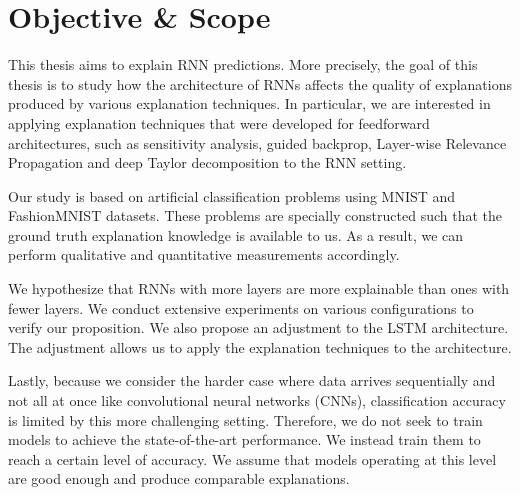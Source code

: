 \section{Objective \& Scope}
This thesis aims to explain RNN predictions. More precisely, the goal of this thesis is to study how the architecture of RNNs affects the quality of explanations produced by various explanation techniques. In particular, we are interested in applying explanation techniques that were developed for feedforward architectures, such as sensitivity analysis, guided backprop, Layer-wise Relevance Propagation and deep Taylor decomposition to the RNN setting. 

Our study is based on artificial classification problems using MNIST and FashionMNIST datasets. These problems are specially constructed such that the ground truth explanation knowledge is available to us. As a result, we can perform qualitative and quantitative measurements accordingly.


We hypothesize that RNNs with more layers are more explainable than ones with fewer layers. We conduct extensive experiments on various configurations to verify our proposition. We also propose an adjustment to the LSTM architecture. The adjustment allows us to apply the explanation techniques to the architecture.

Lastly, because we consider the harder case where data arrives sequentially and not all at once like convolutional neural networks (CNNs), classification accuracy is limited by this more challenging setting. Therefore, we do not seek to train models to achieve the state-of-the-art performance. We instead train them to reach a certain level of accuracy. We assume that models operating at this level are good enough and produce comparable explanations. 
%


%
%
%


